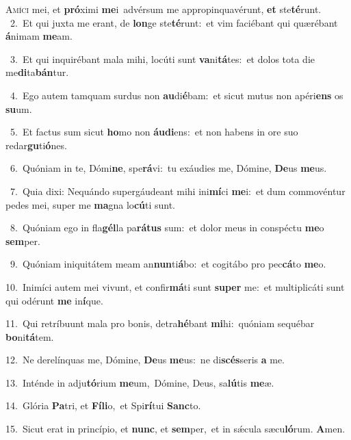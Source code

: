 \lettrine{\initial\textcolor{\initialcolor}{A}}{míci} mei, et \textbf{pró}\-ximi \textbf{me}\-i~\star advérsum me appropinquavérunt, \textbf{et} ste\-\textbf{té}\-runt.\\
{\numbfont\textcolor{\numbcolor}{~2.}}~Et qui juxta me erant, de \textbf{lon}\-ge ste\-\textbf{té}\-runt:~\star et vim faciébant qui quærébant \textbf{á}\-nimam \textbf{me}\-am.\par
{\numbfont\textcolor{\numbcolor}{~3.}}~Et qui inquirébant mala mihi, locúti sunt \textbf{va}\-ni\-\textbf{tá}\-tes:~\star et dolos tota die me\-\textbf{di}\-ta\-\textbf{bán}\-tur.\par
{\numbfont\textcolor{\numbcolor}{~4.}}~Ego autem tamquam surdus non \textbf{au}\-di\-\textbf{é}\-bam:~\star et sicut mutus non apéri\textbf{ens} os \textbf{su}\-um.\par
{\numbfont\textcolor{\numbcolor}{~5.}}~Et factus sum sicut \textbf{ho}\-mo non \textbf{áu}\-\textbf{di}ens:~\star et non habens in ore suo redar\-\textbf{gu}\-ti\-\textbf{ó}\-nes.\par
{\numbfont\textcolor{\numbcolor}{~6.}}~Quóniam in te, Dómi\-\textbf{ne}\-, spe\-\textbf{rá}\-vi:~\star tu exáudies me, Dómine, \textbf{De}\-us \textbf{me}\-us.\par
{\numbfont\textcolor{\numbcolor}{~7.}}~Quia dixi: Nequándo supergáudeant mihi ini\-\textbf{mí}\-ci \textbf{me}\-i:~\star et dum commovéntur pedes mei, super me \textbf{ma}\-gna lo\-\textbf{cú}\-ti sunt.\par
{\numbfont\textcolor{\numbcolor}{~8.}}~Quóniam ego in fla\-\textbf{gél}\-la pa\-\textbf{rá}\-\textbf{tus} sum:~\star et dolor meus in conspéctu \textbf{me}\-o \textbf{sem}\-per.\par
{\numbfont\textcolor{\numbcolor}{~9.}}~Quóniam iniquitátem meam an\-\textbf{nun}\-ti\-\textbf{á}\-bo:~\star et cogitábo pro pec\-\textbf{cá}\-to \textbf{me}\-o.\par
{\numbfont\textcolor{\numbcolor}{10.}}~Inimíci autem mei vivunt, et confir\-\textbf{má}\-ti sunt \textbf{su}\-\textbf{per} me:~\star et multiplicáti sunt qui odérunt \textbf{me} in\-\textbf{í}\-que.\par
{\numbfont\textcolor{\numbcolor}{11.}}~Qui retríbuunt mala pro bonis, detra\-\textbf{hé}\-bant \textbf{mi}\-hi:~\star quóniam sequébar \textbf{bo}\-ni\-\textbf{tá}\-tem.\par
{\numbfont\textcolor{\numbcolor}{12.}}~Ne derelínquas me, Dómine, \textbf{De}\-us \textbf{me}\-us:~\star ne di\-\textbf{scés}\-seris \textbf{a} me.\par
{\numbfont\textcolor{\numbcolor}{13.}}~Inténde in adju\-\textbf{tó}\-rium \textbf{me}\-um,~\star Dómine, Deus, sa\-\textbf{lú}\-tis \textbf{me}\-æ.\par
{\numbfont\textcolor{\numbcolor}{14.}}~Glória \textbf{Pa}\-tri, et \textbf{Fí}\-\textbf{li}o,~\star et Spi\-\textbf{rí}\-tui \textbf{Sanc}\-to.\par
{\numbfont\textcolor{\numbcolor}{15.}}~Sicut erat in princípio, et \textbf{nunc}\-, et \textbf{sem}\-per,~\star et in sǽcula sæcu\-\textbf{ló}\-rum. \textbf{A}\-men.\par
